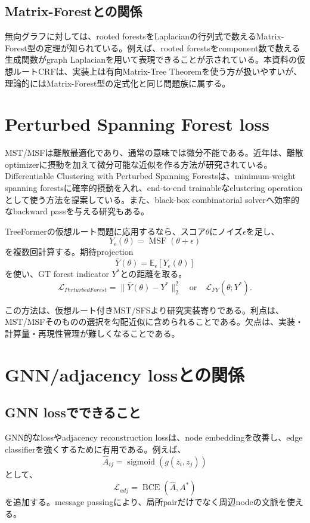 \documentclass[11pt,a4paper]{article}
\newcommand{\E}{\mathbb{E}}
\newcommand{\sigmoid}{\operatorname{sigmoid}}
\begin{document}
\subsection{Matrix-Forestとの関係}
無向グラフに対しては、rooted forestsをLaplacianの行列式で数えるMatrix-Forest型の定理が知られている。例えば、rooted forestsをcomponent数で数える生成関数がgraph Laplacianを用いて表現できることが示されている\cite{bernaklivans2015}。本資料の仮想ルートCRFは、実装上は有向Matrix-Tree Theoremを使う方が扱いやすいが、理論的にはMatrix-Forest型の定式化と同じ問題族に属する。

\section{Perturbed Spanning Forest loss}
MST/MSFは離散最適化であり、通常の意味では微分不能である。近年は、離散optimizerに摂動を加えて微分可能な近似を作る方法が研究されている。Differentiable Clustering with Perturbed Spanning Forestsは、minimum-weight spanning forestsに確率的摂動を入れ、end-to-end trainableなclustering operationとして使う方法を提案している\cite{stewart2023}。また、black-box combinatorial solverへ効率的なbackward passを与える研究もある\cite{vlastelica2020}。

TreeFormerの仮想ルート問題に応用するなら、スコア$\theta$にノイズ$\epsilon$を足し、
\begin{equation}
  Y_\epsilon(\theta)=\operatorname{MSF}(\theta+\epsilon)
\end{equation}
を複数回計算する。期待projection
\begin{equation}
  \bar{Y}(\theta)=\E_\epsilon[Y_\epsilon(\theta)]
\end{equation}
を使い、GT forest indicator $Y^*$との距離を取る。
\begin{equation}
  \mathcal{L}_{PerturbedForest}
  =\|\bar{Y}(\theta)-Y^*\|_2^2
  \quad\text{or}\quad
  \mathcal{L}_{FY}(\theta;Y^*).
\end{equation}

この方法は、仮想ルート付きMST/SFSより研究実装寄りである。利点は、MST/MSFそのものの選択を勾配近似に含められることである。欠点は、実装・計算量・再現性管理が難しくなることである。

\section{GNN/adjacency lossとの関係}
\subsection{GNN lossでできること}
GNN的なlossやadjacency reconstruction lossは、node embeddingを改善し、edge classifierを強くするために有用である。例えば、
\begin{equation}
  \hat{A}_{ij}=\sigmoid(g(z_i,z_j))
\end{equation}
として、
\begin{equation}
  \mathcal{L}_{adj}=\operatorname{BCE}(\hat{A},A^*)
\end{equation}
を追加する。message passingにより、局所pairだけでなく周辺nodeの文脈を使える。
\end{document}
